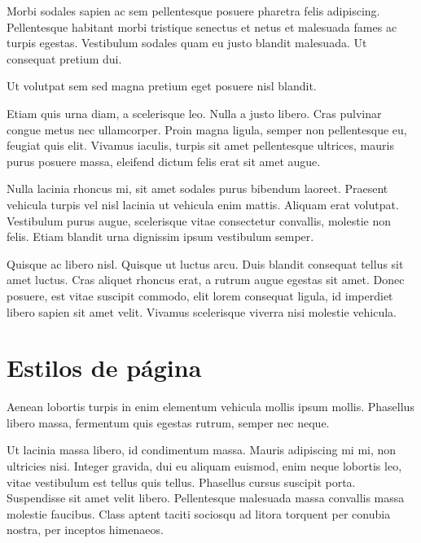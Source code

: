 \documentclass[12pt,a4paper]{report}
\begin{document}
Morbi sodales sapien ac sem pellentesque posuere pharetra felis adipiscing. Pellentesque habitant morbi tristique senectus et netus et malesuada fames ac turpis egestas. Vestibulum sodales quam eu justo blandit malesuada. Ut consequat pretium dui. 

Ut volutpat sem sed magna pretium eget posuere nisl blandit.

Etiam quis urna diam, a scelerisque leo. Nulla a justo libero. Cras pulvinar congue metus nec ullamcorper. Proin magna ligula, semper non pellentesque eu, feugiat quis elit. Vivamus iaculis, turpis sit amet pellentesque ultrices, mauris purus posuere massa, eleifend dictum felis erat sit amet augue. 

Nulla lacinia rhoncus mi, sit amet sodales purus bibendum laoreet. Praesent vehicula turpis vel nisl lacinia ut vehicula enim mattis. Aliquam erat volutpat. Vestibulum purus augue, scelerisque vitae consectetur convallis, molestie non felis. Etiam blandit urna dignissim ipsum vestibulum semper.

Quisque ac libero nisl. Quisque ut luctus arcu. Duis blandit consequat tellus sit amet luctus. Cras aliquet rhoncus erat, a rutrum augue egestas sit amet. Donec posuere, est vitae suscipit commodo, elit lorem consequat ligula, id imperdiet libero sapien sit amet velit. Vivamus scelerisque viverra nisi molestie vehicula. 





\section{Estilos de página}
\label{seccion.estilos}



Aenean lobortis turpis in enim elementum vehicula mollis ipsum mollis. Phasellus libero massa, fermentum quis egestas rutrum, semper nec neque.

Ut lacinia massa libero, id condimentum massa. Mauris adipiscing mi mi, non ultricies nisi. Integer gravida, dui eu aliquam euismod, enim neque lobortis leo, vitae vestibulum est tellus quis tellus. Phasellus cursus suscipit porta. Suspendisse sit amet velit libero. Pellentesque malesuada massa convallis massa molestie faucibus. Class aptent taciti sociosqu ad litora torquent per conubia nostra, per inceptos himenaeos. 
\end{document}
